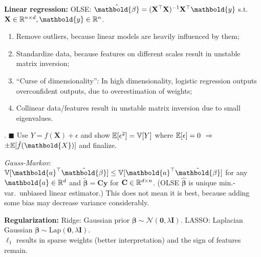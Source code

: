 \documentclass[9pt]{extarticle}
\newenvironment{topic}[1]
{\textbf{\sffamily \colorbox{black}{\rlap{\textbf{\textcolor{white}{#1}}}\hspace{\linewidth}\hspace{-2\fboxsep}}}}
{}
\newenvironment{subtopic}[1]
{\textbf{\sffamily #1:}}
{}
\renewcommand{\mat}[1]{\ensuremath{\mathbf{#1}}}
\renewcommand{\vec}[1]{\ensuremath{\mathbold{#1}}}
\renewcommand{\Var}{\mathbb{V}}
\begin{document}
\begin{multicols*}{3}
\begin{topic}{Regression}
\begin{subtopic}{Linear regression}
            OLSE: $\hat{\vec{\beta}} = \inv{(\transpose{\mat{X}} \mat{X})} \transpose{\mat{X}} \vec{y}$ s.t.\
            $\mat{X} \in \R^{n \times d}, \vec{y} \in \R^n$.
            \begin{enumerate}[left=0pt]
                \item Remove outliers, because linear models are heavily influenced by them;
                \item Standardize data, because features on different scales result in unstable matrix inversion;
                \item ``Curse of dimensionality'': In high dimensionality, logistic regression
                      outputs overconfident outputs, due to overestimation of weights;
                \item Collinear data/features result in unstable matrix inversion due to small eigenvalues.
            \end{enumerate}

            \scalebox{0.85}{$\E[(\hat{f}(\vec{X}) - Y)^2] = (\E[\hat{f}(\vec{X})] - \E[y])^2 + \Var[\hat{f}(\vec{X})] + \Var[y]$}.
            $\blacksquare$ Use $Y = f(\vec{X}) + \epsilon$ and show $\E[\epsilon^2] = \Var[Y]$ where $\mathbb{E}[\epsilon] = 0$ $\Rightarrow$ $\pm \E[\hat{f}(\vec{X})]$ and finalize.

            \textit{Gauss-Markov}: $\Var[\transpose{\vec{a}} \hat{\vec{\beta}}] \leq
                \Var[\transpose{\vec{a}} \tilde{\vec{\beta}}]$ for any $\vec{a} \in \R^d$ and
            $\tilde{\vec{\beta}} = \mat{C}\vec{y}$ for $\mat{C} \in \R^{d \times n}$. (OLSE $\hat{\vec{\beta}}$ is unique min.-var.\
            unbiased linear estimator.) This does not mean it is best, because
            adding some bias may decrease variance considerably.
        \end{subtopic}

        \begin{subtopic}{Regularization}
            Ridge: Gaussian prior $\vec{\beta} \sim \mathcal{N}(\vec{0}, \lambda \mat{I})$. LASSO:
            Laplacian Gaussian $\vec{\beta} \sim \mathrm{Lap}(\vec{0}, \lambda \mat{I})$. \\ $\ell_1$
            results in sparse weights (better interpretation) and the sign of features remain.
        \end{subtopic}


\end{topic}
\end{multicols*}
\end{document}

